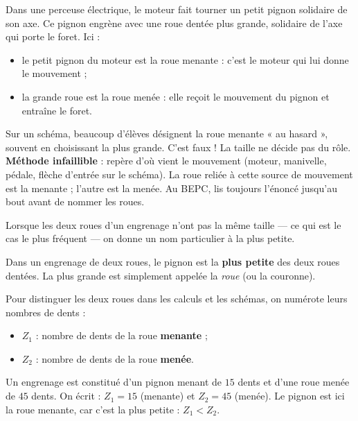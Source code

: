 \documentclass[11pt]{article}
\newcommand{\cle}[1]{{\popxbold\color{popdark}#1}}
\newcounter{popsec}
\newcounter{popsub}
\newcommand{\courssub}[1]{%
  \stepcounter{popsub}%
  \par\vspace{9pt}\noindent{\popxbold\fontsize{11.5}{13}\selectfont\color{popink}{\color{poporange}\thepopsec.\thepopsub}\hspace{6pt}#1}\par\nopagebreak\vspace{4pt}
}
\begin{document}
\begin{exemplebox}[La perceuse]
Dans une perceuse électrique, le moteur fait tourner un petit pignon solidaire de son axe. Ce pignon engrène avec une roue dentée plus grande, solidaire de l'axe qui porte le foret. Ici :
\begin{itemize}
\item le petit pignon du moteur est la \cle{roue menante} : c'est le moteur qui lui donne le mouvement ;
\item la grande roue est la \cle{roue menée} : elle reçoit le mouvement du pignon et entraîne le foret.
\end{itemize}
\end{exemplebox}

\begin{attention}
Sur un schéma, beaucoup d'élèves désignent la roue menante « au hasard », souvent en choisissant la plus grande. C'est faux ! La taille ne décide pas du rôle. \textbf{Méthode infaillible} : repère d'où vient le mouvement (moteur, manivelle, pédale, flèche d'entrée sur le schéma). La roue reliée à cette source de mouvement est la menante ; l'autre est la menée. Au BEPC, lis toujours l'énoncé jusqu'au bout avant de nommer les roues.
\end{attention}

\courssub{Le pignon et le nombre de dents}

Lorsque les deux roues d'un engrenage n'ont pas la même taille — ce qui est le cas le plus fréquent — on donne un nom particulier à la plus petite.

\begin{definition}[Pignon]
Dans un engrenage de deux roues, le \cle{pignon} est la \textbf{plus petite} des deux roues dentées. La plus grande est simplement appelée la \emph{roue} (ou la couronne).
\end{definition}

Pour distinguer les deux roues dans les calculs et les schémas, on numérote leurs nombres de dents :

\begin{itemize}
\item \cle{$Z_1$} : nombre de dents de la roue \textbf{menante} ;
\item \cle{$Z_2$} : nombre de dents de la roue \textbf{menée}.
\end{itemize}

\begin{exemplebox}
Un engrenage est constitué d'un pignon menant de $15$ dents et d'une roue menée de $45$ dents. On écrit : $Z_1 = 15$ (menante) et $Z_2 = 45$ (menée). Le pignon est ici la roue menante, car c'est la plus petite : $Z_1 < Z_2$.
\end{exemplebox}
\end{document}
